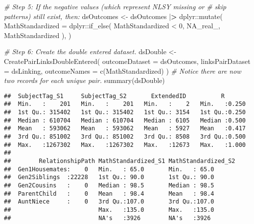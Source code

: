 \documentclass[smallextended]{svjour3}       %
\newenvironment{Shaded}{\begin{snugshade}}{\end{snugshade}}
\newcommand{\AttributeTok}[1]{\textcolor[rgb]{0.77,0.63,0.00}{#1}}
\newcommand{\CommentTok}[1]{\textcolor[rgb]{0.56,0.35,0.01}{\textit{#1}}}
\newcommand{\ConstantTok}[1]{\textcolor[rgb]{0.00,0.00,0.00}{#1}}
\newcommand{\DecValTok}[1]{\textcolor[rgb]{0.00,0.00,0.81}{#1}}
\newcommand{\ErrorTok}[1]{\textcolor[rgb]{0.64,0.00,0.00}{\textbf{#1}}}
\newcommand{\FunctionTok}[1]{\textcolor[rgb]{0.00,0.00,0.00}{#1}}
\newcommand{\NormalTok}[1]{#1}
\newcommand{\OtherTok}[1]{\textcolor[rgb]{0.56,0.35,0.01}{#1}}
\newcommand{\SpecialCharTok}[1]{\textcolor[rgb]{0.00,0.00,0.00}{#1}}
\newcommand{\StringTok}[1]{\textcolor[rgb]{0.31,0.60,0.02}{#1}}
\begin{document}
\begin{Shaded}
\begin{Highlighting}[]
\CommentTok{\# Step 5: If the negative values (which represent NLSY missing or}
\CommentTok{\#   skip patterns) still exist, then:}
\NormalTok{dsOutcomes }\OtherTok{\textless{}{-}}
\NormalTok{  dsOutcomes }\SpecialCharTok{|}\ErrorTok{\textgreater{}} 
\NormalTok{  dplyr}\SpecialCharTok{::}\FunctionTok{mutate}\NormalTok{(}
    \AttributeTok{MathStandardized =}\NormalTok{ dplyr}\SpecialCharTok{::}\FunctionTok{if\_else}\NormalTok{(}
\NormalTok{      MathStandardized }\SpecialCharTok{\textless{}} \DecValTok{0}\NormalTok{,}
      \ConstantTok{NA\_real\_}\NormalTok{,}
\NormalTok{      MathStandardized}
\NormalTok{    ),}
\NormalTok{  )}

\CommentTok{\# Step 6: Create the double entered dataset.}
\NormalTok{dsDouble }\OtherTok{\textless{}{-}} 
  \FunctionTok{CreatePairLinksDoubleEntered}\NormalTok{(}
    \AttributeTok{outcomeDataset   =}\NormalTok{ dsOutcomes,}
    \AttributeTok{linksPairDataset =}\NormalTok{ dsLinking,}
    \AttributeTok{outcomeNames     =} \FunctionTok{c}\NormalTok{(}\StringTok{\textquotesingle{}MathStandardized\textquotesingle{}}\NormalTok{)}
\NormalTok{  )}
\CommentTok{\# Notice there are now two records for each unique pair.}
\FunctionTok{summary}\NormalTok{(dsDouble) }
\end{Highlighting}
\end{Shaded}

\begin{verbatim}
##  SubjectTag_S1     SubjectTag_S2       ExtendedID          R        
##  Min.   :    201   Min.   :    201   Min.   :    2   Min.   :0.250  
##  1st Qu.: 315402   1st Qu.: 315402   1st Qu.: 3154   1st Qu.:0.250  
##  Median : 610704   Median : 610704   Median : 6105   Median :0.500  
##  Mean   : 593062   Mean   : 593062   Mean   : 5927   Mean   :0.417  
##  3rd Qu.: 851002   3rd Qu.: 851002   3rd Qu.: 8508   3rd Qu.:0.500  
##  Max.   :1267302   Max.   :1267302   Max.   :12673   Max.   :1.000  
##                                                                     
##        RelationshipPath MathStandardized_S1 MathStandardized_S2
##  Gen1Housemates:    0   Min.   : 65.0       Min.   : 65.0      
##  Gen2Siblings  :22228   1st Qu.: 90.0       1st Qu.: 90.0      
##  Gen2Cousins   :    0   Median : 98.5       Median : 98.5      
##  ParentChild   :    0   Mean   : 98.4       Mean   : 98.4      
##  AuntNiece     :    0   3rd Qu.:107.0       3rd Qu.:107.0      
##                         Max.   :135.0       Max.   :135.0      
##                         NA's   :3926        NA's   :3926
\end{verbatim}
\end{document}
